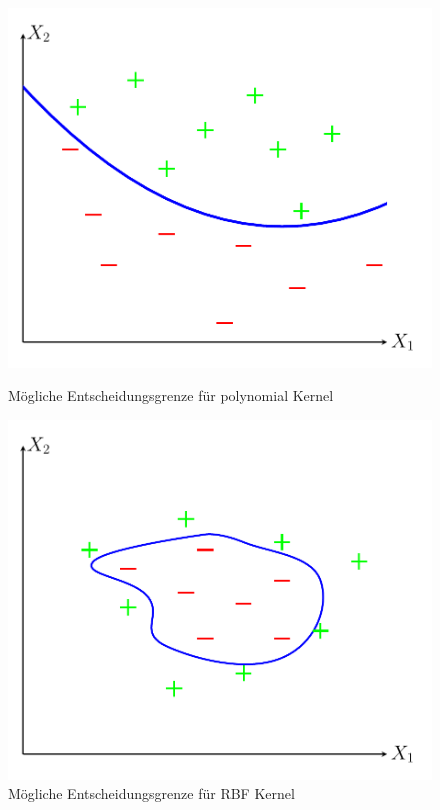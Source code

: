 \documentclass[
]{article}
\begin{document}
\begin{figure}[htb]
    \centering
    \begin{minipage}{0.45\textwidth} 
        \centering
        \includegraphics[width=\textwidth,trim=0.5cm 0.5cm 0.5cm 0.5cm]{Images/ploynomial kernel.pdf} 
        \caption{Mögliche Entscheidungsgrenze für polynomial Kernel}
        \label{fig:polykernel}
    \end{minipage}\hfill
    \begin{minipage}{0.45\textwidth} 
        \centering
        \includegraphics[width=\textwidth,trim=0.5cm 0.5cm 0.5cm 0.5cm]{Images/radial_kernel.pdf}
        \caption{Mögliche Entscheidungsgrenze für RBF Kernel}
        \label{fig:radialkernel}
    \end{minipage}
\end{figure}
\end{document}
